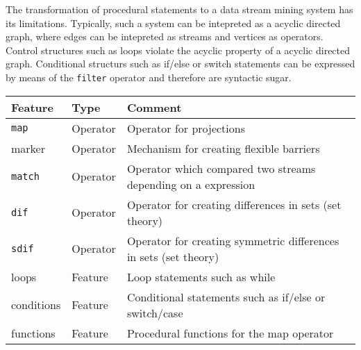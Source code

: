 The transformation of procedural statements to a data stream mining system
has its limitations. Typically, such a system can be intepreted as a acyclic 
directed graph, where edges can be intepreted as streams and vertices as 
operators. Control structures such as loops violate the acyclic property of a 
acyclic directed graph. Conditional structurs such as 
if/else or switch statements can be expressed by means of the \texttt{filter}
operator and therefore are syntactic sugar. 
\begin{center}
  \begin{tabular}{|l|l|l|}
  \hline
  \textbf{Feature} & \textbf{Type} & \textbf{Comment} \\
  \hline
  \hline
  \texttt{map} & Operator & Operator for projections \\
  \hline
  marker & Operator & Mechanism for creating flexible barriers \\
  \hline
  \texttt{match} & Operator & Operator which compared two streams depending on a expression \\
  \hline
  \texttt{dif} & Operator & Operator for creating differences in sets (set theory) \\
  \hline
  \texttt{sdif} & Operator & Operator for creating symmetric differences in sets (set theory) \\
  \hline
  loops & Feature & Loop statements such as while  \\
  \hline
  conditions & Feature & Conditional statements such as if/else or switch/case \\
  \hline
  functions & Feature & Procedural functions for the map operator \\
  \hline
  \end{tabular}
  \label{tab:deprecated}
\end{center}

